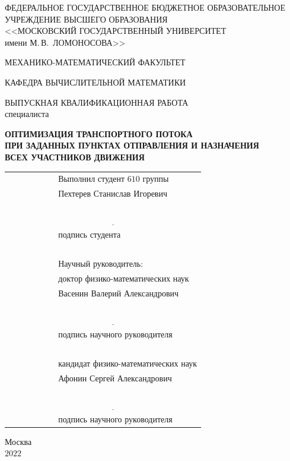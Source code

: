 \documentclass[12pt, a4paper]{article}
\begin{document}
\pagestyle{empty}

\begin{center}
	ФЕДЕРАЛЬНОЕ ГОСУДАРСТВЕННОЕ БЮДЖЕТНОЕ ОБРАЗОВАТЕЛЬНОЕ\\
	УЧРЕЖДЕНИЕ ВЫСШЕГО ОБРАЗОВАНИЯ\\
	<<МОСКОВСКИЙ ГОСУДАРСТВЕННЫЙ УНИВЕРСИТЕТ\\
	имени М.\,В.~ЛОМОНОСОВА>>
\end{center}
\vspace{4pt}
\begin{center}
	МЕХАНИКО-МАТЕМАТИЧЕСКИЙ ФАКУЛЬТЕТ
\end{center}
\vspace{4pt}
\begin{center}
	КАФЕДРА ВЫЧИСЛИТЕЛЬНОЙ МАТЕМАТИКИ
\end{center}
\vspace{1cm}
\begin{center}
	ВЫПУСКНАЯ КВАЛИФИКАЦИОННАЯ РАБОТА\\
	специалиста
\end{center}

\begin{center}
	\textbf{ОПТИМИЗАЦИЯ ТРАНСПОРТНОГО ПОТОКА \\
		    ПРИ ЗАДАННЫХ ПУНКТАХ ОТПРАВЛЕНИЯ И НАЗНАЧЕНИЯ \\
		    ВСЕХ УЧАСТНИКОВ ДВИЖЕНИЯ}
\end{center}
\vspace{1cm}
\begin{center}
	\begin{tabular}{p{9cm} l}
		& Выполнил студент $610$ группы\\
		& Пехтерев Станислав Игоревич\\
		& $\underline{\phantom{\int\limits_a^bf(x)dx=F(b)-F(a)}}$\\
		& подпись студента\\
		 $\phantom{C_n^k=C_n^{n-k}}$\\
		& Научный руководитель:\\
		& доктор физико-математических наук \\
		& Васенин Валерий Александрович\\
		& $\underline{\phantom{\int\limits_a^bf(x)dx=F(b)-F(a)}}$\\
		& подпись научного руководителя\\
		& $\phantom{C_n^k=C_n^{n-k}}$\\
		& кандидат физико-математических наук \\
		& Афонин Сергей Александрович\\
		& $\underline{\phantom{\int\limits_a^bf(x)dx=F(b)-F(a)}}$\\
		& подпись научного руководителя\\
	\end{tabular}
\end{center}
\vspace{1cm}
\begin{center}
	Москва\\
	$2022$
\end{center}
\end{document}
